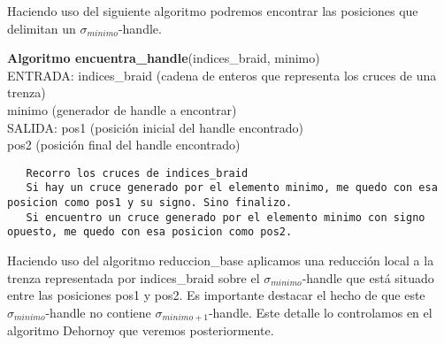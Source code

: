 \newpage
Haciendo uso del siguiente algoritmo podremos encontrar las posiciones que delimitan un $\sigma_{minimo}$-handle.
\begin{alg}
	\textbf{Algoritmo encuentra\_handle}(indices\_braid, minimo)\\
	ENTRADA: indices\_braid (cadena de enteros que representa los cruces de una trenza)\\
	\hspace*{2.2cm} minimo (generador de handle a encontrar) \\
	SALIDA: \hspace{0.4cm} pos1 (posición inicial del handle encontrado) \\
	\hspace*{2.2cm} pos2 (posición final del handle encontrado)
	
\begin{lstlisting}
   Recorro los cruces de indices_braid
   Si hay un cruce generado por el elemento minimo, me quedo con esa posicion como pos1 y su signo. Sino finalizo.
   Si encuentro un cruce generado por el elemento minimo con signo opuesto, me quedo con esa posicion como pos2.
\end{lstlisting}
\end{alg}

\bigskip
Haciendo uso del algoritmo reduccion\_base aplicamos una reducción local a la trenza representada por indices\_braid sobre el $\sigma_{minimo}$-handle que está situado entre las posiciones pos1 y pos2. Es importante destacar el hecho de que este $\sigma_{minimo}$-handle  no contiene $\sigma_{minimo+1}$-handle. Este detalle lo controlamos en el algoritmo Dehornoy que veremos posteriormente. \\

